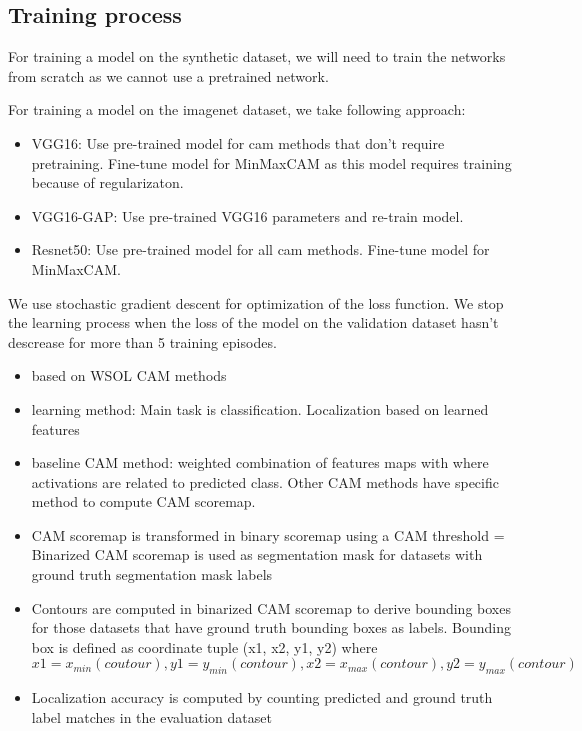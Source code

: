 \subsection{Training process}
For training a model on the synthetic dataset, we will need to train the networks from scratch as we cannot use a pretrained network.

For training a model on the imagenet dataset, we take following approach:
\begin{itemize}
    \item VGG16: Use pre-trained model for \acrshort{cam} methods that don't require pretraining. Fine-tune model for MinMaxCAM as this model requires training because of regularizaton.
    \item VGG16-GAP: Use pre-trained VGG16 parameters and re-train model.
    \item Resnet50: Use pre-trained model for all \acrshort{cam} methods. Fine-tune model for MinMaxCAM.
\end{itemize}

We use stochastic gradient descent for optimization of the loss function. We stop the learning process when the loss of the model on the validation dataset hasn't descrease for more than 5 training episodes.

\begin{itemize}
    \item based on WSOL CAM methods
    \item learning method: Main task is classification. Localization based on learned features
    \item baseline CAM method: weighted combination of features maps with where activations are related to predicted class. Other CAM methods have specific method to compute CAM scoremap.
    \item CAM scoremap is transformed in binary scoremap using a CAM threshold = Binarized CAM scoremap is used as segmentation mask for datasets with ground truth segmentation mask labels
    \item Contours are computed in binarized CAM scoremap to derive bounding boxes for those datasets that have ground truth bounding boxes as labels. Bounding box is defined as coordinate tuple (x1, x2, y1, y2) where $x1 = x_{min}(coutour), y1 = y_{min}(contour), x2 = x_{max}(contour), y2 = y_{max}(contour)$
    \item Localization accuracy is computed by counting predicted and ground truth label matches in the evaluation dataset
\end{itemize}

